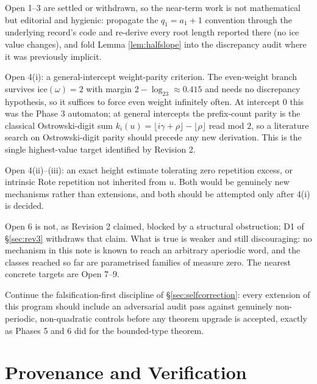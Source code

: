 \documentclass[11pt]{article}
\begin{document}
\begin{description}[leftmargin=3em,style=nextline]
\item[Near term.] Open 1--3 are settled or withdrawn, so the near-term work is not mathematical but
editorial and hygienic: propagate the $q_1=a_1+1$ convention through the underlying record's code
and re-derive every root length reported there (no $\text{ice}$ value changes), and fold Lemma
\ref{lem:halfslope} into the discrepancy audit where it was previously implicit.
\item[Medium term.] Open 4(i): a general-intercept weight-parity criterion. The even-weight branch
survives $\text{ice}(\omega)=2$ with margin $2-\log_23\approx0.415$ and needs no discrepancy
hypothesis, so it suffices to force even weight infinitely often. At intercept $0$ this was the
Phase 3 automaton; at general intercepts the prefix-count parity is the classical Ostrowski-digit
sum $k_i(u)=\lfloor i\gamma+\rho\rfloor-\lfloor\rho\rfloor$ read mod $2$, so a literature search on
Ostrowski-digit parity should precede any new derivation. This is the single highest-value target
identified by Revision 2.
\item[Longer term.] Open 4(ii)--(iii): an exact height estimate tolerating zero repetition excess,
or intrinsic Rote repetition not inherited from $u$. Both would be genuinely new mechanisms rather
than extensions, and both should be attempted only after 4(i) is decided.
\item[Structural.] Open 6 is not, as Revision 2 claimed, blocked by a structural obstruction; D1 of
\S\ref{sec:rev3} withdraws that claim. What is true is weaker and still discouraging: no mechanism in
this note is known to reach an arbitrary aperiodic word, and the classes reached so far are
parametrised families of measure zero. The nearest concrete targets are Open 7--9.
\item[Process.] Continue the falsification-first discipline of \S\ref{sec:selfcorrection}: every extension of this program should include an adversarial audit pass against genuinely non-periodic, non-quadratic controls before any theorem upgrade is accepted, exactly as Phases 5 and 6 did for the bounded-type theorem.
\end{description}

\section*{Provenance and Verification}
\end{document}
